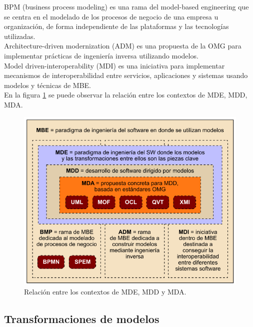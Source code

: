 BPM (business process modeling) es una rama del model-based engineering que se centra en el modelado de los procesos de negocio de una empresa u organización, de forma independiente de las plataformas y las tecnologías utilizadas.\\

Architecture-driven modernization (ADM) es una propuesta de la OMG para implementar prácticas de ingeniería inversa utilizando modelos.\\

Model driven-interoperability (MDI) es una iniciativa para implementar mecanismos de interoperabilidad entre servicios, aplicaciones y sistemas usando modelos y técnicas de MBE.\\

En la figura \ref{fig:Relacíon entre los contextos de MDE, MDD y MDA} se puede observar la relación entre los contextos de MDE, MDD, MDA.

\begin{figure}[!h] 
	\begin{center}
		\includegraphics [scale=0.50]{imagenes/Relacion_MDE_MDD_MDA.png}
	\end{center}
	\caption{Relación entre los contextos de MDE, MDD y MDA.}
	\label{fig:Relacíon entre los contextos de MDE, MDD y MDA}
\end{figure} 

\subsection{Transformaciones de modelos}
\label{Transformaciones de modelos}

